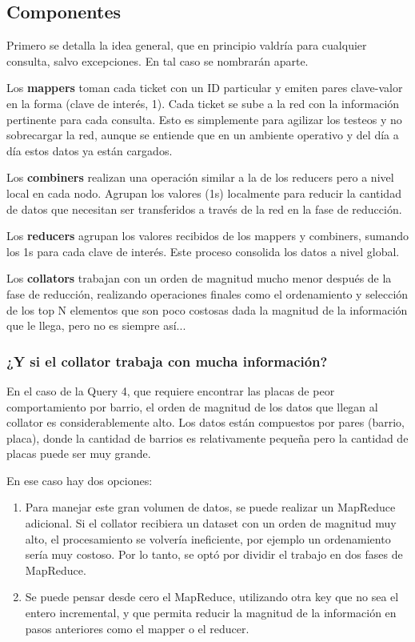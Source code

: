 \documentclass[a4paper,12pt]{article}
\begin{document}
	\subsection{Componentes}
	
	Primero se detalla la idea general, que en principio valdría para cualquier consulta, salvo excepciones. En tal caso se nombrarán aparte.
	
	\bigskip
	
	Los \textbf{mappers} toman cada ticket con un ID particular y emiten pares clave-valor en la forma (clave de interés, 1). Cada ticket se sube a la red con la información pertinente para cada consulta. Esto es simplemente para agilizar los testeos y no sobrecargar la red, aunque se entiende que en un ambiente operativo y del día a día estos datos ya están cargados.
	
	\bigskip
	
	Los \textbf{combiners} realizan una operación similar a la de los reducers pero a nivel local en cada nodo. Agrupan los valores (1s) localmente para reducir la cantidad de datos que necesitan ser transferidos a través de la red en la fase de reducción.
	
	\bigskip
	
	Los \textbf{reducers} agrupan los valores recibidos de los mappers y combiners, sumando los 1s para cada clave de interés. Este proceso consolida los datos a nivel global.
	
	\bigskip
	
	Los \textbf{collators} trabajan con un orden de magnitud mucho menor después de la fase de reducción, realizando operaciones finales como el ordenamiento y selección de los top N elementos que son poco costosas dada la magnitud de la información que le llega, pero no es siempre así...
	
	\subsubsection{¿Y si el collator trabaja con mucha información?}
	
	En el caso de la Query 4, que requiere encontrar las placas de peor comportamiento por barrio, el orden de magnitud de los datos que llegan al collator es considerablemente alto. Los datos están compuestos por pares (barrio, placa), donde la cantidad de barrios es relativamente pequeña pero la cantidad de placas puede ser muy grande.
	
	\bigskip
	En ese caso hay dos opciones: 
	
	\begin{enumerate}
		\item Para manejar este gran volumen de datos, se puede realizar un MapReduce adicional. Si el collator recibiera un dataset con un orden de magnitud muy alto, el procesamiento se volvería ineficiente, por ejemplo un ordenamiento sería muy costoso. Por lo tanto, se optó por dividir el trabajo en dos fases de MapReduce.
		\item Se puede pensar desde cero el MapReduce, utilizando otra key que no sea el entero incremental, y que permita reducir la magnitud de la información en pasos anteriores como el mapper o el reducer.
	\end{enumerate}
\end{document}
